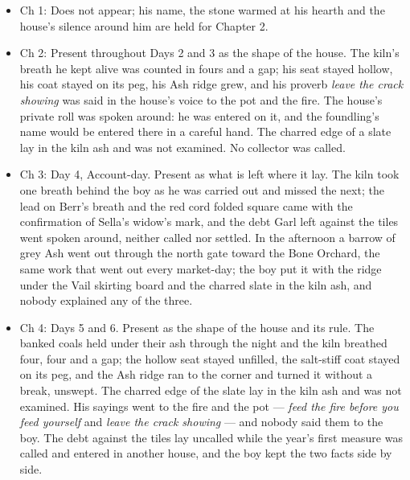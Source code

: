 \documentclass{design/chronicle}
\begin{document}
{
\begin{itemize}[leftmargin=1.4em,itemsep=1pt,topsep=3pt,parsep=0pt]

\item Ch 1: Does not appear; his name, the stone warmed at his hearth and the house’s silence around him are held for Chapter 2.

\item Ch 2: Present throughout Days 2 and 3 as the shape of the house. The kiln’s breath he kept alive was counted in fours and a gap; his seat stayed hollow, his coat stayed on its peg, his Ash ridge grew, and his proverb \emph{leave the crack showing} was said in the house’s voice to the pot and the fire. The house’s private roll was spoken around: he was entered on it, and the foundling’s name would be entered there in a careful hand. The charred edge of a slate lay in the kiln ash and was not examined. No collector was called.

\item Ch 3: Day 4, Account-day. Present as what is left where it lay. The kiln took one breath behind the boy as he was carried out and missed the next; the lead on Berr’s breath and the red cord folded square came with the confirmation of Sella’s widow’s mark, and the debt Garl left against the tiles went spoken around, neither called nor settled. In the afternoon a barrow of grey Ash went out through the north gate toward the Bone Orchard, the same work that went out every market-day; the boy put it with the ridge under the Vail skirting board and the charred slate in the kiln ash, and nobody explained any of the three.

\end{itemize}

\begin{itemize}[leftmargin=1.4em,itemsep=1pt,topsep=3pt,parsep=0pt]

\item Ch 4: Days 5 and 6. Present as the shape of the house and its rule. The banked coals held under their ash through the night and the kiln breathed four, four and a gap; the hollow seat stayed unfilled, the salt-stiff coat stayed on its peg, and the Ash ridge ran to the corner and turned it without a break, unswept. The charred edge of the slate lay in the kiln ash and was not examined. His sayings went to the fire and the pot --- \emph{feed the fire before you feed yourself} and \emph{leave the crack showing} --- and nobody said them to the boy. The debt against the tiles lay uncalled while the year’s first measure was called and entered in another house, and the boy kept the two facts side by side.


\end{itemize}}
\end{document}
